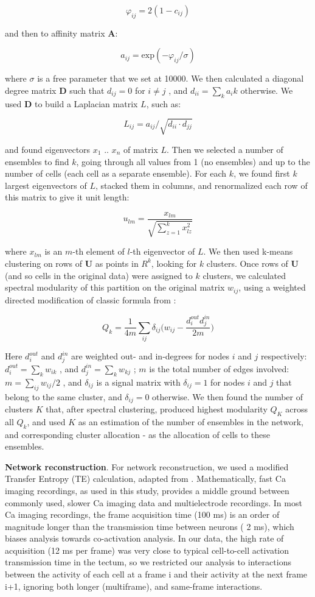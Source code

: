\documentclass{article}
\begin{document}
$$\varphi_{ij} = 2(1-c_{ij})$$

and then to affinity matrix $\textbf{A}$:

$$a_{ij} = \text{exp}(-\varphi_{ij}/\sigma)$$

where $\sigma$ is a free parameter that we set at 10000. We then calculated a diagonal degree matrix $\textbf{D}$ such that $d_{ij} = 0$ for $i \neq j$ , and $d_{ii} = \sum_k{a_ik}$ otherwise. We used $\textbf{D}$ to build a Laplacian matrix $L$, such as:

$$L_{ij} = a_{ij}/\sqrt{d_{ii}\cdot d_{jj}}$$

and found eigenvectors $x_1$ .. $x_n$ of matrix $L$. Then we selected a number of ensembles to find $k$, going through all values from 1 (no ensembles) and up to the number of cells (each cell as a separate ensemble). For each $k$, we found first $k$ largest eigenvectors of $L$, stacked them in columns, and renormalized each row of this matrix to give it unit length:

$$u_{lm} = \frac{x_{lm}}{\sqrt{\sum_{z=1}^{k}{x_{lz}^2}}}$$

where $x_{lm}$ is an $m$-th element of $l$-th eigenvector of $L$. We then used k-means clustering on rows of $\textbf{U}$ as points in $R^k$, looking for $k$ clusters. Once rows of $\textbf{U}$ (and so cells in the original data) were assigned to $k$ clusters, we calculated spectral modularity of this partition on the original matrix $w_{ij}$, using a weighted directed modification of classic formula from \citep{newman2006modularity}:

$$Q_k = \frac{1}{4m}\sum_{ij}{\delta_{ij}\Big(w_{ij}-\frac{d^{out}_i d^{in}_j}{2m}}\Big)$$

Here $d^{out}_i$ and $d^{in}_j$ are weighted out- and in-degrees for nodes $i$ and $j$ respectively: $d^{out}_i = \sum_k{w_{ik}}$ , and $d^{in}_j = \sum_k{w_{kj}}$ ; $m$ is the total number of edges involved: $m = \sum_{ij}{w_{ij}}/2$ , and $\delta_{ij}$ is a signal matrix with $\delta_{ij}=1$ for nodes $i$ and $j$ that belong to the same cluster, and $\delta_{ij} = 0$ otherwise. We then found the number of clusters $K$ that, after spectral clustering, produced highest modularity $Q_K$ across all $Q_k$, and used $K$ as an estimation of the number of ensembles in the network, and corresponding cluster allocation - as the allocation of cells to these ensembles.

\textbf{Network reconstruction}. For network reconstruction, we used a modified Transfer Entropy (TE) calculation, adapted from \citep{stetter2012te,gourevitch2007te}. Mathematically, fast Ca imaging recordings, as used in this study, provides a middle ground between commonly used, slower Ca imaging data and multielectrode recordings. In most Ca imaging recordings, the frame acquisition time (100 ms) is an order of magnitude longer than the transmission time between neurons ( 2 ms), which biases analysis towards co-activation analysis. In our data, the high rate of acquisition (12 ms per frame) was very close to typical cell-to-cell activation transmission time in the tectum, so we restricted our analysis to interactions between the activity of each cell at a frame i and their activity at the next frame i+1, ignoring both longer (multiframe), and same-frame interactions.
\end{document}
